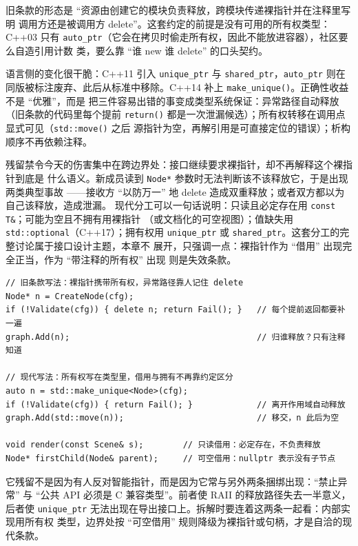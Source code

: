 \documentclass[12pt,a4paper,fontset=fandol]{ctexbook}
\newcommand{\cpp}[1]{C++#1}
\newcommand{\Fn}[1]{\texttt{#1()}}
\newcommand{\Tp}[1]{\texttt{#1}}
\begin{document}
旧条款的形态是 ``资源由创建它的模块负责释放，跨模块传递裸指针并在注释里写明
调用方还是被调用方 delete''。这套约定的前提是没有可用的所有权类型：\cpp{03} 只有
\Tp{auto\_ptr}（它会在拷贝时偷走所有权，因此不能放进容器），社区要么自造引用计数
类，要么靠 ``谁 new 谁 delete'' 的口头契约。

语言侧的变化很干脆：\cpp{11} 引入 \Tp{unique\_ptr} 与 \Tp{shared\_ptr}，\Tp{auto\_ptr}
则在同版被标注废弃、此后从标准中移除。\cpp{14} 补上 \Fn{make\_unique}。正确性收益不是 ``优雅''，而是
把三件容易出错的事变成类型系统保证：异常路径自动释放（旧条款的代码里每个提前
\Fn{return} 都是一次泄漏候选）；所有权转移在调用点显式可见（\Fn{std::move} 之后
源指针为空，再解引用是可直接定位的错误）；析构顺序不再依赖注释。

残留禁令今天的伤害集中在跨边界处：接口继续要求裸指针，却不再解释这个裸指针到底是
什么语义。新成员读到 \Tp{Node*} 参数时无法判断该不该释放它，于是出现两类典型事故
——接收方 ``以防万一'' 地 delete 造成双重释放；或者双方都以为自己该释放，造成泄漏。
现代分工可以一句话说明：只读且必定存在用 \Tp{const T\&}；可能为空且不拥有用裸指针
（或文档化的可空视图）；值缺失用 \Tp{std::optional}（\cpp{17}）；拥有权用
\Tp{unique\_ptr} 或 \Tp{shared\_ptr}。这套分工的完整讨论属于接口设计主题，本章不
展开，只强调一点：裸指针作为 ``借用'' 出现完全正当，作为 ``带注释的所有权'' 出现
则是失效条款。

\begin{lstlisting}[style=cppstyle,caption={同一接口的两种所有权表达},label={lst:ch12-ownership}]
// 旧条款写法：裸指针携带所有权，异常路径靠人记住 delete
Node* n = CreateNode(cfg);
if (!Validate(cfg)) { delete n; return Fail(); }   // 每个提前返回都要补一遍
graph.Add(n);                                      // 归谁释放？只有注释知道

// 现代写法：所有权写在类型里，借用与拥有不再靠约定区分
auto n = std::make_unique<Node>(cfg);
if (!Validate(cfg)) { return Fail(); }             // 离开作用域自动释放
graph.Add(std::move(n));                           // 移交，n 此后为空

void render(const Scene& s);        // 只读借用：必定存在，不负责释放
Node* firstChild(Node& parent);     // 可空借用：nullptr 表示没有子节点
\end{lstlisting}

\begin{note}[title={为什么这条禁令会长期残留}]
它残留不是因为有人反对智能指针，而是因为它常与另外两条捆绑出现：``禁止异常'' 与
``公共 API 必须是 C 兼容类型''。前者使 RAII 的释放路径失去一半意义，后者使
\Tp{unique\_ptr} 无法出现在导出接口上。拆解时要连着这两条一起看：内部实现用所有权
类型，边界处按 ``可空借用'' 规则降级为裸指针或句柄，才是自洽的现代条款。
\end{note}
\end{document}
